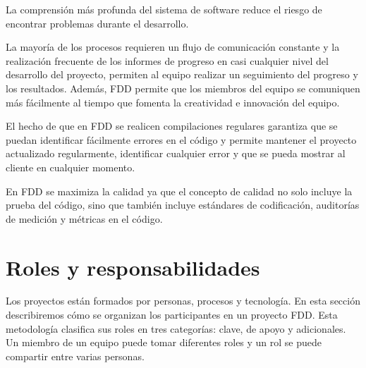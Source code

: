 \documentclass[11pt]{article}
\begin{document}
La comprensión más profunda del sistema de software reduce el riesgo de encontrar problemas durante el desarrollo.

La mayoría de los procesos requieren un flujo de comunicación constante y la realización frecuente de los informes de progreso en casi cualquier nivel del desarrollo del proyecto, permiten al equipo realizar un seguimiento del progreso y los resultados. Además, FDD permite que los miembros del equipo se comuniquen más fácilmente al tiempo que fomenta la creatividad e innovación del equipo.

El hecho de que en FDD se realicen compilaciones regulares garantiza que se puedan identificar fácilmente errores en el código y permite mantener el proyecto actualizado regularmente, identificar cualquier error y que se pueda mostrar al cliente en cualquier momento. 

En FDD se maximiza la calidad ya que el concepto de calidad no solo incluye la prueba del código, sino que también incluye estándares de codificación, auditorías de medición y métricas en el código.

\section{Roles y responsabilidades}

Los proyectos están formados por personas, procesos y tecnología. En esta sección describiremos cómo se organizan los participantes en un proyecto FDD. Esta metodología clasifica sus roles en tres categorías: clave, de apoyo y adicionales. Un miembro de un equipo puede tomar diferentes roles y un rol se puede compartir entre varias personas.\\
\end{document}
